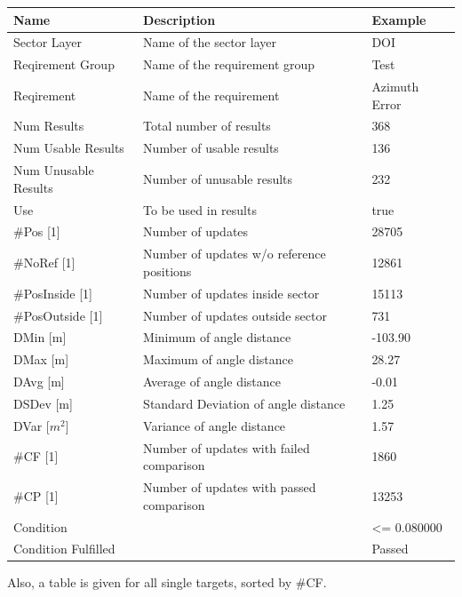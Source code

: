 \begin{center}
 \begin{table}[H]
  \begin{tabularx}{\textwidth}{ | l | X |  l | }
    \hline
    \textbf{Name} & \textbf{Description} & \textbf{Example} \\ \hline
  Sector Layer & Name of the sector layer & DOI  \\ \hline
  Reqirement Group & Name of the requirement group & Test  \\ \hline
  Reqirement & Name of the requirement & Azimuth Error  \\ \hline
  Num Results & Total number of results & 368  \\ \hline
  Num Usable Results & Number of usable results & 136  \\ \hline
  Num Unusable Results & Number of unusable results & 232  \\ \hline
  Use & To be used in results & true  \\ \hline
  \#Pos [1] & Number of updates & 28705  \\ \hline
  \#NoRef [1] & Number of updates w/o reference positions & 12861  \\ \hline
  \#PosInside [1] & Number of updates inside sector & 15113  \\ \hline
  \#PosOutside [1] & Number of updates outside sector & 731  \\ \hline
  DMin [m] & Minimum of angle distance & -103.90  \\ \hline
  DMax [m] & Maximum of angle distance & 28.27  \\ \hline
  DAvg [m] & Average of angle distance & -0.01  \\ \hline
  DSDev [m] & Standard Deviation of angle distance & 1.25  \\ \hline
  DVar [$m^2$] & Variance of angle distance & 1.57  \\ \hline
  \#CF [1] & Number of updates with failed comparison & 1860  \\ \hline
  \#CP [1] & Number of updates with passed comparison  & 13253  \\ \hline
  Condition &  & <= 0.080000  \\ \hline
  Condition Fulfilled &  & Passed  \\ \hline
\end{tabularx}
\end{table}
\end{center}

Also, a table is given for all single targets, sorted by \#CF.

